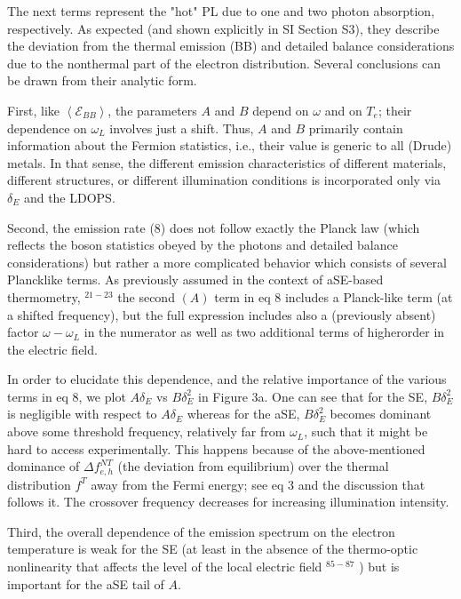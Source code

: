 \documentclass[10pt]{article}
\begin{document}
The next terms represent the "hot" PL due to one and two photon absorption, respectively. As expected (and shown explicitly in SI Section S3), they describe the deviation from the thermal emission (BB) and detailed balance considerations due to the nonthermal part of the electron distribution. Several conclusions can be drawn from their analytic form.

First, like $\left\langle\mathcal{E}_{B B}\right\rangle$, the parameters $A$ and $B$ depend on $\omega$ and on $T_{e}$; their dependence on $\omega_{L}$ involves just a shift. Thus, $A$ and $B$ primarily contain information about the Fermion statistics, i.e., their value is generic to all (Drude) metals. In that sense, the different emission characteristics of different materials, different structures, or different illumination conditions is incorporated only via $\delta_{E}$ and the LDOPS.

Second, the emission rate (8) does not follow exactly the Planck law (which reflects the boson statistics obeyed by the photons and detailed balance considerations) but rather a more complicated behavior which consists of several Plancklike terms. As previously assumed in the context of aSE-based thermometry, ${ }^{21-23}$ the second $(A)$ term in eq 8 includes a Planck-like term (at a shifted frequency), but the full expression includes also a (previously absent) factor $\omega-\omega_{L}$ in the numerator as well as two additional terms of higherorder in the electric field.

In order to elucidate this dependence, and the relative importance of the various terms in eq 8, we plot $A \delta_{E}$ vs $B \delta_{E}^{2}$ in Figure 3a. One can see that for the SE, $B \delta_{E}^{2}$ is negligible with respect to $A \delta_{E}$ whereas for the aSE, $B \delta_{E}^{2}$ becomes dominant above some threshold frequency, relatively far from $\omega_{L}$, such that it might be hard to access experimentally. This happens because of the above-mentioned dominance of $\Delta f_{e, h}^{N T}$ (the deviation from equilibrium) over the thermal distribution $f^{T}$ away from the Fermi energy; see eq 3 and the discussion that follows it. The crossover frequency decreases for increasing illumination intensity.

Third, the overall dependence of the emission spectrum on the electron temperature is weak for the SE (at least in the absence of the thermo-optic nonlinearity that affects the level of the local electric field ${ }^{85-87}$ ) but is important for the aSE tail of $A$.
\end{document}
